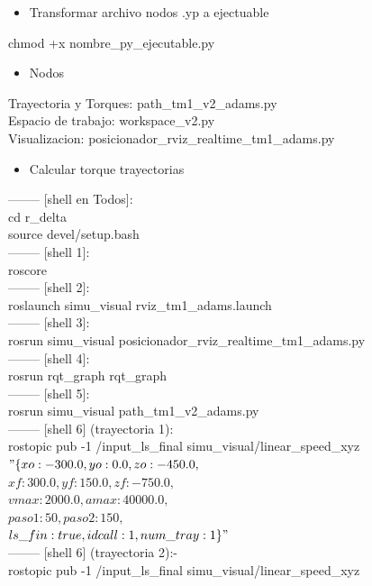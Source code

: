     \begin{itemize}
        \item Transformar archivo nodos .yp a ejectuable
    \end{itemize}
chmod +x nombre\_py\_ejecutable.py\\
    \begin{itemize}
        \item Nodos
    \end{itemize}
Trayectoria y Torques: path\_tm1\_v2\_adams.py\\
Espacio de trabajo: workspace\_v2.py\\
Visualizacion: posicionador\_rviz\_realtime\_tm1\_adams.py\\
    \begin{itemize}
        \item Calcular torque trayectorias
    \end{itemize}
-------- [shell en Todos]: \\
cd r\_delta\\
source devel/setup.bash\\
-------- [shell 1]: \\
roscore\\
-------- [shell 2]: \\
roslaunch simu\_visual rviz\_tm1\_adams.launch\\
-------- [shell 3]:\\
rosrun simu\_visual posicionador\_rviz\_realtime\_tm1\_adams.py\\
-------- [shell 4]:\\
rosrun rqt\_graph rqt\_graph\\
-------- [shell 5]: \\
rosrun simu\_visual path\_tm1\_v2\_adams.py\\
-------- [shell 6] (trayectoria 1):\\
rostopic pub -1 /input\_ls\_final simu\_visual/linear\_speed\_xyz\\
$"\{xo: -300.0, yo: 0.0, zo: -450.0,$\\
$xf: 300.0, yf: 150.0, zf: -750.0,$\\
$vmax: 2000.0, amax: 40000.0,$\\
$paso1: 50,  paso2: 150,$\\
$ls\_fin: true, idcall: 1, num\_tray: 1\}"$\\
-------- [shell 6] (trayectoria 2):-\\
rostopic pub -1 /input\_ls\_final simu\_visual/linear\_speed\_xyz\\
